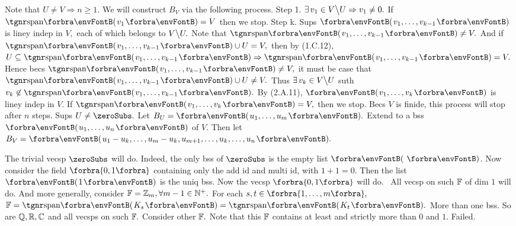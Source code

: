 \TextB{\vspace{0pt}}
Note that $U\neq V\Rightarrow n\geqslant 1.$ We will construct $B_V$ via the following process.\TextB{}
{\tgbfx Step 1.} $\exists\,v_1\in V\big\backslash U\Rightarrow v_1\neq 0.$ If $\Span{v_1}=V$ then we stop.\TextB{}
{\tgbfx Step k.} Sups $\Par{v_1,\dots,v_{k-1}}$ is liney indep in $V,$ each of which belongs to $V\big\backslash U.$\TextB{}
 Note that $\Span{v_1,\dots,v_{k-1}}\neq V.$ And if $\Span{v_1,\dots,v_{k-1}}\cup U=V,$ then by (1.C.12),\TextB{}
  $U\subseteq \Span{v_1,\dots,v_{k-1}}\Rightarrow\Span{v_1,\dots,v_{k-1}}=V.$\TextB{}
 Hence becs $\Span{v_1,\dots,v_{k-1}}\neq V,$ it must be case that $\Span{v_1,\dots,v_{k-1}}\cup U\neq V.$\TextB{}
 Thus $\exists\,v_k\in V\big\backslash U$ suth $v_k\not\in\Span{v_1,\dots,v_{k-1}}.$\TextB{}
 By (2.A.11), $\Par{v_1,\dots,v_k}$ is liney indep in $V$. If $\Span{v_1,\dots,v_k}=V,$ then we stop.\TextB{}
Becs $V$ is finide, this process will stop after $n$ steps.\PfEnd\vspace{4pt}\TextB{}
\Or Sups $U\neq\zeroSubs.$ Let $B_U=\Par{u_1,\dots,u_m}.$ Extend to a bss $\Par{u_1,\dots,u_n}$ of $V.$\TextB{}
\Blind{\Or}Then let $B_V=\Par{u_1-u_k,\dots,u_m-u_k,u_{m+1},\dots,u_k,\dots,u_n}.$\PfEnd
\SepLine

The trivial vecsp $\zeroSubs$ will do. Indeed, the only bss of $\zeroSubs$ is the empty list $\Par{\,}$.\parSol{}
Now consider the field $\Bra{0,1}$ containing only the add id and multi id,\parSol{}
with $1+1=0.$ Then the list $\Par{1}$ is the uniq bss. Now the vecsp $\Bra{0,1}$ will do.\parSol{}
\Comment \,\,\,All vecsp on such ${\mathbb{F}}$ of dim $1$ will do.\parSol{}
And more generally, consider ${\mathbb{F}}={\mathbb{Z}}_m,\forall m-1\in{\mathbb{N}^+}.$ For each $s,t\in\Bra{1,\dots,m},$\parSol{}
$\Fbb=\Span{K_s}=\Span{K_t}.$ More than one bss. So are ${\mathbb{Q}},{\mathbb{R}},{\mathbb{C}}$ and all vecsps on such ${\mathbb{F}}.$\parSol{}
Consider other ${\mathbb{F}}.$ Note that this ${\mathbb{F}}$ contains at least and strictly more than $0$ and $1.$ Failed.\PfEnd
\SepLine

